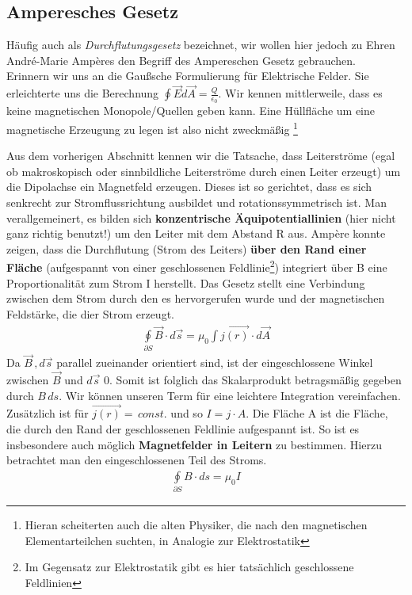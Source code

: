 \subsection{Amperesches Gesetz} \label{sec:Amperesches Gesetz}
Häufig auch als \textit{Durchflutungsgesetz} bezeichnet, wir wollen hier jedoch zu Ehren André-Marie Ampères den Begriff des Ampereschen Gesetz gebrauchen. \\
Erinnern wir uns an die Gaußsche Formulierung für Elektrische Felder. Sie erleichterte uns die Berechnung $ \oint \vec{E} d\vec{A} = \tfrac{Q}{\epsilon_0}$.
Wir kennen mittlerweile, dass es keine magnetischen Monopole/Quellen geben kann. Eine Hüllfläche um eine magnetische Erzeugung zu legen ist also nicht zweckmäßig \footnote{Hieran scheiterten auch die alten Physiker, die nach den magnetischen Elementarteilchen suchten, in Analogie zur Elektrostatik} \par
Aus dem vorherigen Abschnitt kennen wir die Tatsache, dass Leiterströme (egal ob makroskopisch oder sinnbildliche Leiterströme durch einen Leiter erzeugt) um die Dipolachse ein Magnetfeld erzeugen. Dieses ist so gerichtet, dass es sich senkrecht zur Stromflussrichtung ausbildet und rotationssymmetrisch ist. Man verallgemeinert, es bilden sich \textbf{konzentrische Äquipotentiallinien} (hier nicht ganz richtig benutzt!)  um den Leiter mit dem Abstand R aus.
Ampère konnte zeigen, dass die Durchflutung (Strom des Leiters) \textbf{über den Rand einer Fläche} (aufgespannt von einer geschlossenen Feldlinie\footnote{Im Gegensatz zur Elektrostatik gibt es hier tatsächlich geschlossene Feldlinien}) integriert über B eine Proportionalität zum Strom I herstellt. Das Gesetz stellt eine Verbindung zwischen dem Strom durch den es hervorgerufen wurde und der magnetischen Feldstärke, die dier Strom erzeugt.
\begin{align} \label{eqn:Amperesches Gesetz} 
\oint \limits_{\partial S} \vec{B} \cdot d\vec{s} = \mu_0 \int \limits \vec{j\left( r \right)} \cdot d\vec{A}
\end{align}
Da $\vec{B} \, , d\vec{s}$ parallel zueinander orientiert sind, ist der eingeschlossene Winkel zwischen $\vec{B}$ und $d\vec{s}$ 0. Somit ist folglich das Skalarprodukt betragsmäßig gegeben durch $B \, ds$. Wir können unseren Term für eine leichtere Integration vereinfachen. Zusätzlich ist für $\vec{j\left( r \right)} = \, const.$ und so $I = j \cdot A$. Die Fläche A ist die Fläche, die durch den Rand der geschlossenen Feldlinie aufgespannt ist. So ist es insbesondere auch möglich \textbf{Magnetfelder in Leitern} zu bestimmen. Hierzu betrachtet man den eingeschlossenen Teil des Stroms.
\begin{align*}
\boxed{\oint \limits_{\partial S} B \cdot ds = \mu_0 I}
\end{align*}

